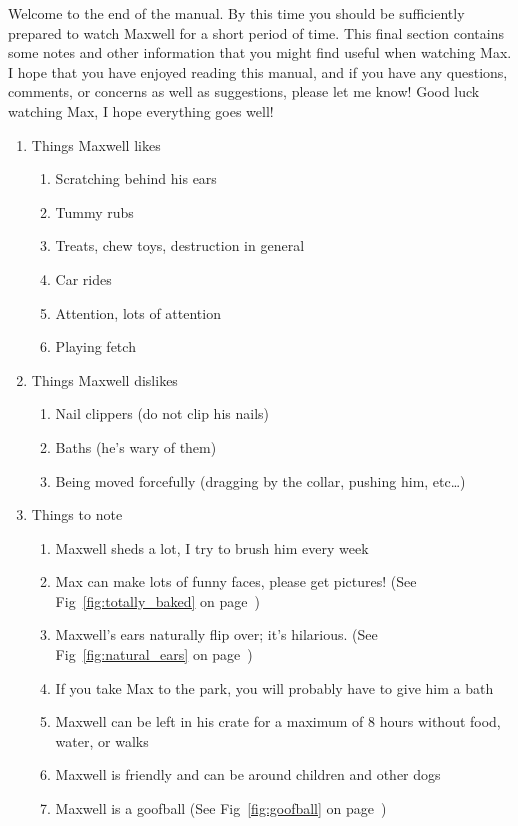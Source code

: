 \documentclass[pdftex,12pt]{article}
\begin{document}
Welcome to the end of the manual. By this time you should be sufficiently
prepared to watch Maxwell for a short period of time. This final section
contains some notes and other information that you might find useful when
watching Max. I hope that you have enjoyed reading this manual, and if you have
any questions, comments, or concerns as well as suggestions, please let me know!
Good luck watching Max, I hope everything goes well!

\bigskip

\begin{enumerate}\label{itm:other_information}
    \item Things Maxwell likes
        \begin{enumerate}
            \item Scratching behind his ears
            \item Tummy rubs
            \item Treats, chew toys, destruction in general
            \item Car rides
            \item Attention, lots of attention
            \item Playing fetch
        \end{enumerate}
    \item Things Maxwell dislikes
        \begin{enumerate}
            \item Nail clippers (do not clip his nails)
            \item Baths (he's wary of them)
            \item Being moved forcefully (dragging by the collar, pushing him,
                etc\ldots)
        \end{enumerate}
    \item Things to note
        \begin{enumerate}
            \item Maxwell sheds a lot, I try to brush him every week
            \item Max can make lots of funny faces, please get pictures! (See
                Fig~\ref{fig:totally_baked} on page~\pageref{fig:totally_baked})
            \item Maxwell's ears naturally flip over; it's hilarious. (See
                Fig~\ref{fig:natural_ears} on page~\pageref{fig:natural_ears})
            \item If you take Max to the park, you will probably have to give
                him a bath
            \item Maxwell can be left in his crate for a maximum of 8 hours
                without food, water, or walks
            \item Maxwell is friendly and can be around children and other dogs
            \item Maxwell is a goofball (See Fig~\ref{fig:goofball} on
                page~\pageref{fig:goofball})
        \end{enumerate}
\end{enumerate}
\end{document}
